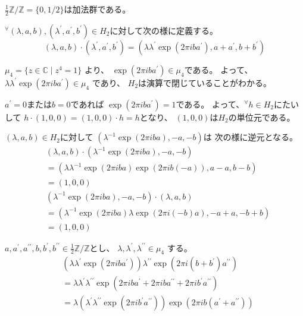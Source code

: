 \documentclass[12pt,b5paper]{ltjsarticle}
\begin{document}
\begin{description}
\begin{description}
$\frac{1}{2}\mathbb{Z}/\mathbb{Z}=\{0,1/2\}$は加法群である。

             ${}^{\forall}(\lambda,a,b),(\lambda^{\prime},a^{\prime},b^{\prime}) \in H_{2}$に対して次の様に定義する。
             \begin{equation}
              (\lambda,a,b)\cdot(\lambda^{\prime},a^{\prime},b^{\prime})
               =(\lambda\lambda^{\prime} \exp{(2\pi iba^{\prime})},a+a^{\prime},b+b^{\prime})
             \end{equation}

             $\mu_{4}=\{z\in\mathbb{C} \mid z^{4}=1 \}$
             より、
             $\exp{(2\pi iba^{\prime})} \in \mu_{4}$である。
             よって、
             $\lambda\lambda^{\prime} \exp{(2\pi iba^{\prime})} \in \mu_{4}$
             であり、
             $H_{2}$は演算で閉じていることがわかる。

             $a^{\prime}=0$または$b=0$であれば
             $\exp{(2\pi iba^{\prime})}=1$である。
             よって、${}^{\forall}h\in H_{2}$にたいして
             $h \cdot (1,0,0) = (1,0,0)\cdot h =h$となり、
             $(1,0,0)$は$H_{2}$の単位元である。


             $(\lambda,a,b)\in H_{2}$に対して
             $(\lambda^{-1}\exp{(2\pi iba)},-a,-b)$は
             次の様に逆元となる。
             \begin{align}
              &(\lambda,a,b)\cdot(\lambda^{-1}\exp{(2\pi iba)},-a,-b)\\
               &=(\lambda\lambda^{-1}\exp{(2\pi iba)} \exp{(2\pi ib(-a))},a-a,b-b)\\
               &=(1,0,0)
              \\
              & (\lambda^{-1}\exp{(2\pi iba)},-a,-b) \cdot (\lambda,a,b)\\
              &= (\lambda^{-1}\exp{(2\pi iba)}\lambda \exp{(2\pi i(-b)a)},-a+a,-b+b)\\
              &=(1,0,0)
             \end{align}

             $a,a^{\prime},a^{\prime\prime},b,b^{\prime},b^{\prime\prime}\in\frac{1}{2}\mathbb{Z}/\mathbb{Z}$とし、
             $\lambda,\lambda^{\prime},\lambda^{\prime\prime}\in\mu_{4}$
             する。
             \begin{align}
              & \left( \lambda\lambda^{\prime}\exp(2\pi iba^{\prime}) \right)
               \lambda^{\prime\prime}
               \exp{(2\pi i (b+b^{\prime})a^{\prime\prime})}
              \\
              &= \lambda\lambda^{\prime}\lambda^{\prime\prime}
                \exp{(2\pi iba^{\prime}
              + 2\pi i ba^{\prime\prime}
              + 2\pi i b^{\prime}a^{\prime\prime})}
              \\
              &=
              \lambda
               \left( \lambda^{\prime}\lambda^{\prime\prime}\exp(2\pi ib^{\prime}a^{\prime\prime}) \right)
               \exp{(2\pi i b(a^{\prime}+a^{\prime\prime}))}
             \end{align}


\end{description}
\end{description}
\end{document}
